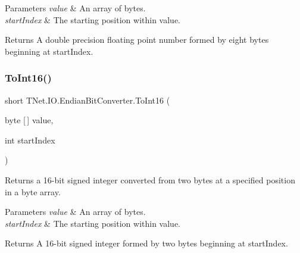\begin{DoxyParams}{Parameters}
{\em value} & An array of bytes.\\
\hline
{\em start\+Index} & The starting position within value.\\
\hline
\end{DoxyParams}
\begin{DoxyReturn}{Returns}
A double precision floating point number formed by eight bytes beginning at start\+Index.
\end{DoxyReturn}
\mbox{\label{class_t_net_1_1_i_o_1_1_endian_bit_converter_a57927039a631af103ed63e8b0a91e660}} 
\subsubsection{\texorpdfstring{To\+Int16()}{ToInt16()}}
{\footnotesize\ttfamily short T\+Net.\+I\+O.\+Endian\+Bit\+Converter.\+To\+Int16 (\begin{DoxyParamCaption}\item[{byte \mbox{[}$\,$\mbox{]}}]{value,  }\item[{int}]{start\+Index }\end{DoxyParamCaption})}



Returns a 16-\/bit signed integer converted from two bytes at a specified position in a byte array. 


\begin{DoxyParams}{Parameters}
{\em value} & An array of bytes.\\
\hline
{\em start\+Index} & The starting position within value.\\
\hline
\end{DoxyParams}
\begin{DoxyReturn}{Returns}
A 16-\/bit signed integer formed by two bytes beginning at start\+Index.
\end{DoxyReturn}
\mbox{\label{class_t_net_1_1_i_o_1_1_endian_bit_converter_aa8b78416e423bdbc0bdae03ade423796}} 
